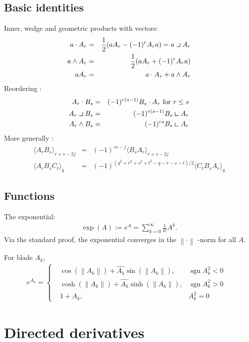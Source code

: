 \documentclass[a4paper,12pt]{article}
\newcommand{\grade}[2]{\ensuremath{\langle#2\rangle_{#1}}}
\newcommand{\linner}{\mathbin{\ensuremath{\scalebox{1.4}{$\lrcorner$}}}}
\newcommand{\rinner}{\mathbin{\ensuremath{\scalebox{1.4}{$\llcorner$}}}}
\providecommand{\norm}[1]{\left\lVert#1\right\rVert}
\providecommand{\normed}[1]{\hat{#1}}
\DeclareMathOperator{\sign}{sgn}
\begin{document}
\subsection{Basic identities}

Inner, wedge and geometric products with vectors\cite{CA2GC}:
\begin{eqnarray}
a\cdot A_r &=& \frac{1}{2}(a A_r - (-1)^r A_r a) = a\linner A_r\\
a\wedge A_r &=& \frac{1}{2}(a A_r + (-1)^r A_r a)\\
a A_r &=& a \cdot A_r + a \wedge A_r
\end{eqnarray}
Reordering \cite{CA2GC, Chisolm:2012aa}:
\begin{eqnarray}
 A_r\cdot B_s &=& (-1)^{r(s-1)} B_s \cdot A_r\ \textrm{for}\ r \leq s\\
 A_r\linner B_s &=& (-1)^{r(s-1)} B_s \rinner A_r\\
 A_r\wedge B_s &=& (-1)^{rs} B_s \rinner A_r\\
\end{eqnarray}
More generally \cite{CA2GC, Chisolm:2012aa}:
\begin{eqnarray}
 \grade{r+s-2j}{A_r B_s} &=& (-1)^{rs - j} \grade{r + s - 2j}{B_s A_r}\\
 \grade{q}{A_r B_s C_t} &=& (-1)^{(q^2 + r^2 + s^2 + t^2 - q - r - s - t)/2} \grade{q}{C_t B_s A_r}
\end{eqnarray}

\subsection{Functions}

The exponential:
\begin{align}
\exp(A) := e^{A} =  \sum_{k = 0}^\infty \frac{1}{k!} A^k.
\end{align}
Via the standard proof, the exponential converges in the $\norm{\cdot}$ -norm for all $A$.

For blade $A_k$,
\begin{align}
e^{A_k} = \left\{\begin{aligned}
	 &\cos(\norm{A_k}) + \normed{A_k} \sin(\norm{A_k}), &\sign{A_k^2} < 0&\\
	&\cosh(\norm{A_k}) + \normed{A_k} \sinh(\norm{A_k}), &\sign{A_k^2} > 0&\\
	&1 + A_k, &A_k^2 = 0&
	\end{aligned} \right.
\end{align}

\section{Directed derivatives}
\end{document}

